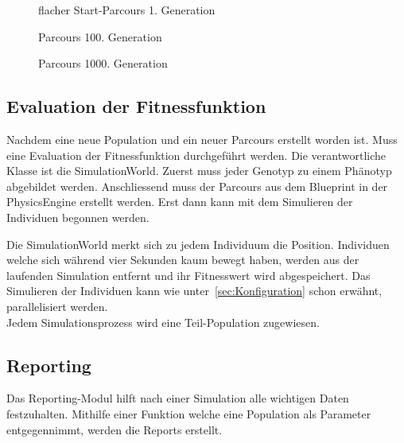       \begin{figure}[H]
        \centering
        
        \caption{flacher Start-Parcours 1. Generation\label{fig:parcours1}}
      \end{figure}

      \begin{figure}[H]
        \centering
        
        \caption{Parcours 100. Generation\label{fig:parcours2}}
      \end{figure}

      \begin{figure}[H]
        \centering
        
        \caption{Parcours 1000. Generation\label{fig:parcours3}}
      \end{figure}

      \subsection{Evaluation der Fitnessfunktion\label{sec:simulation}}

        Nachdem eine neue Population und ein neuer Parcours erstellt worden ist.
        Muss eine Evaluation der Fitnessfunktion durchgeführt werden.
        Die verantwortliche Klasse ist die SimulationWorld.
        Zuerst muss jeder Genotyp zu einem Phänotyp abgebildet werden.
        Anschliessend muss der Parcours aus dem Blueprint in der \gls{PhysicsEngine} erstellt werden.
        Erst dann kann mit dem Simulieren der Individuen begonnen werden.

        \medskip

        Die SimulationWorld merkt sich zu jedem Individuum die Position.
        Individuen welche sich während vier Sekunden kaum bewegt haben,
        werden aus der laufenden Simulation entfernt und ihr Fitnesswert wird abgespeichert.
        Das Simulieren der Individuen kann wie unter~\vref{sec:Konfiguration} schon erwähnt, parallelisiert werden.
        \\
        Jedem Simulationsprozess wird eine Teil-Population zugewiesen.

    \subsection{Reporting\label{subsec:Reporting}}

      Das Reporting-Modul hilft nach einer Simulation alle wichtigen Daten festzuhalten.
      Mithilfe einer Funktion welche eine Population als Parameter entgegennimmt,
      werden die Reports erstellt.

